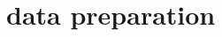 \documentclass{article}
\begin{document}


\section{data preparation}
\label{sec:data-preparation}


\end{document}
